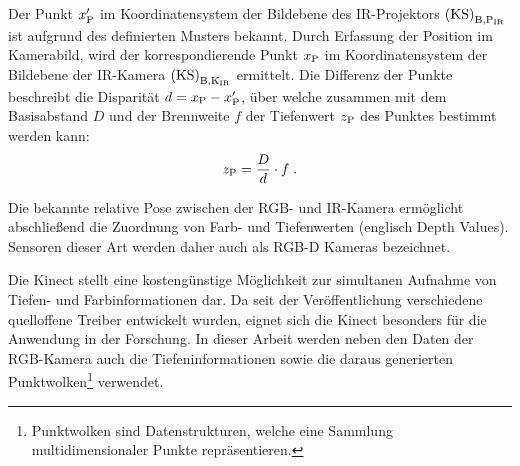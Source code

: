Der Punkt $x_{{\mathrm{P}}}'$ im Koordinatensystem der Bildebene des IR-Projektors ${\mathrm{(KS)}}_{\mathrm{B,P_{IR}}}$ ist aufgrund des definierten Musters bekannt. Durch Erfassung der Position im Kamerabild, wird der korrespondierende Punkt $x_{{\mathrm{P}}}$ im Koordinatensystem der Bildebene der IR-Kamera ${\mathrm{(KS)}}_{\mathrm{B,K_{IR}}}$ ermittelt. Die Differenz der Punkte beschreibt die Disparität $d = x_{\mathrm{P}} - x_{{\mathrm{P}}}'$, über welche zusammen mit dem Basisabstand $D$ und der Brennweite $f$ der Tiefenwert $z_{\mathrm{P}}$ des Punktes bestimmt werden kann:
%
%
%
\begin{equation}
z_{\mathrm{P}} = \frac{D}{d}\cdot f \; \text{.}
\end{equation}

Die bekannte relative Pose zwischen der RGB- und IR-Kamera ermöglicht abschließend die Zuordnung von Farb- und Tiefenwerten (englisch Depth Values). Sensoren dieser Art werden daher auch als RGB-D Kameras bezeichnet.\\


Die Kinect stellt eine kostengünstige Möglichkeit zur simultanen Aufnahme von Tiefen- und Farbinformationen dar. Da seit der Veröffentlichung verschiedene quelloffene Treiber entwickelt wurden, eignet sich die Kinect besonders für die Anwendung in der Forschung. In dieser Arbeit werden neben den Daten der RGB-Kamera auch die Tiefeninformationen sowie die daraus generierten Punktwolken\footnote{Punktwolken sind Datenstrukturen, welche eine Sammlung multidimensionaler Punkte repräsentieren.
} verwendet.


